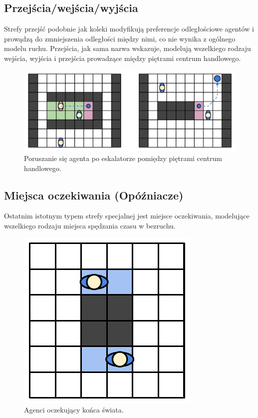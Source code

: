 \documentclass[a4paper, 12pt]{article}
\begin{document}
    \subsection{Przejścia/wejścia/wyjścia}
    \label{sec:entrance-exits}

Strefy przejść podobnie jak koleki modyfikują preferencje odległościowe agentów i prowądzą do zmniejszenia odległości między nimi, co nie wynika z ogólnego modelu ruchu. Przejścia, jak sama nazwa wskazuje, modelują wszelkiego rodzaju wejścia, wyjścia i przejścia prowadzące między piętrami centrum handlowego.

    \begin{figure}[H]
        \centering
        \includegraphics[scale=0.4]{./img/EntranceExits.pdf}
        \caption{Poruszanie się agenta po eskalatorze pomiędzy piętrami centrum handlowego.}
        \label{fig:passing-through}
    \end{figure}

    \subsection{Miejsca oczekiwania (Opóźniacze)}
    \label{sec:holders}

Ostatnim istotnym typem strefy specjalnej jest miejsce oczekiwania, modelujące wszelkiego rodzaju miejsca spędzania czasu w bezruchu.

    \begin{figure}[H]
        \centering
        \includegraphics[scale=0.4]{./img/Held.pdf}
        \caption{Agenci oczekujący końca świata.}
        \label{fig:held-down}
    \end{figure}
\end{document}
